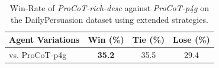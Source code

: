 \begin{table}[t]
    \footnotesize
    \centering
    \begin{tabular}{lccc}
        \toprule
        \textbf{Agent Variations} & \textbf{Win (\%)} & \textbf{Tie (\%)} & \textbf{Lose (\%)} \\
        \midrule
        vs. ProCoT-p4g & \textbf{35.2} & 35.5 & 29.4 \\
        \bottomrule
    \end{tabular}
    \caption{Win-Rate of \textit{ProCoT-rich-desc} against \textit{ProCoT-p4g} on the DailyPersuasion dataset using extended strategies.} 
    \label{tab:result-extended-strategies}
\end{table}
